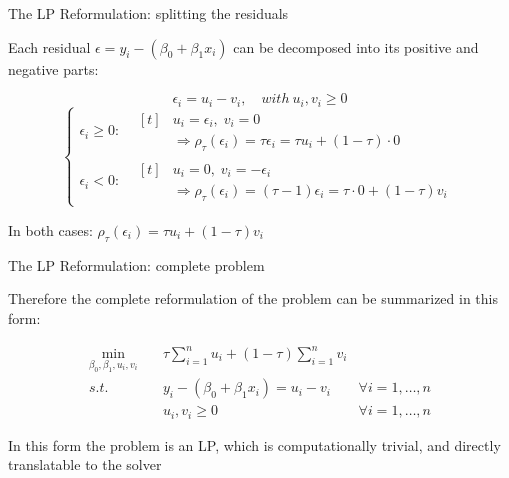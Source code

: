 \documentclass{beamer}
\begin{document}
\begin{frame}{The LP Reformulation: splitting the residuals}
	\begin{center}
		Each residual $\epsilon = y_i - (\beta_0+\beta_1x_i)$ can be decomposed into its positive and negative parts:

		\[
			\epsilon_i=u_i-v_i,\quad with\ u_i, v_i \geq 0
		\]
		\[
			\begin{cases}
				\epsilon_i \geq 0\colon &
				\begin{aligned}[t]
					 & u_i = \epsilon_i,\; v_i = 0       \\
					 & \Rightarrow \rho_\tau(\epsilon_i)
					= \tau\epsilon_i
					= \tau u_i + (1-\tau)\cdot 0
				\end{aligned} \\
				\epsilon_i < 0\colon    &
				\begin{aligned}[t]
					 & u_i = 0,\; v_i = -\epsilon_i      \\
					 & \Rightarrow \rho_\tau(\epsilon_i)
					= (\tau-1)\epsilon_i
					= \tau\cdot 0 + (1-\tau)v_i
				\end{aligned}
			\end{cases}
		\]

		In both cases: $\rho_\tau(\epsilon_i) = \tau u_i + (1-\tau)v_i$
	\end{center}
\end{frame}

\begin{frame}{The LP Reformulation: complete problem}
	\begin{center}
		Therefore the complete reformulation of the problem can be summarized in this form:\hfill

		\begin{align*}
			\min_{\beta_0,\beta_1,u_i,v_i}\quad & \tau\sum_{i=1}^n u_i + (1-\tau)\sum_{i=1}^n v_i                              \\
			s.t.\quad                           & y_i-(\beta_0+\beta_1 x_i) = u_i - v_i         \quad & \forall i=1,\ldots,n   \\
			                                    & u_i,v_i \geq 0\qquad                                & \forall i = 1,\ldots,n
		\end{align*}

		In this form the problem is an LP, which is computationally trivial, and directly translatable to the solver

	\end{center}
\end{frame}
\end{document}
